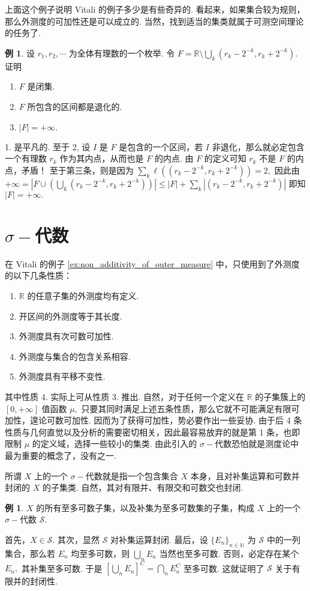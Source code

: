 \documentclass[12pt, a4paper, oneside]{book}
\numberwithin{figure}{section}
\theoremstyle{definition}
\newtheorem{example}[theorem]{例}
\begin{document}
上面这个例子说明 Vitali 的例子多少是有些奇异的. 看起来，如果集合较为规则，那么外测度的可加性还是可以成立的. 当然，找到适当的集类就属于可测空间理论的任务了.

\begin{example}
    设 $r_1,r_2,\cdots$ 为全体有理数的一个枚举. 令 $F=\mathbb R\setminus \bigcup_{k} (r_k-2^{-k},r_k+2^{-k}).$ 证明
    \begin{enumerate}
        \item $F$ 是闭集.
        \item $F$ 所包含的区间都是退化的.
        \item $|F|=+\infty.$
    \end{enumerate}
\end{example}
1. 是平凡的. 至于 2, 设 $I$ 是 $F$ 是包含的一个区间，若 $I$ 非退化，那么就必定包含一个有理数 $r_k$ 作为其内点，从而也是 $F$ 的内点. 由 $F$ 的定义可知 $r_k$ 不是 $F$ 的内点，矛盾！ 
至于第三条，则是因为 $\sum_k \ell((r_k-2^{-k},r_k+2^{-k}))=2,$ 因此由 $+\infty=|F\cup (\bigcup_k (r_k-2^{-k},r_k+2^{-k}))|\leq |F|+\sum_k |(r_k-2^{-k},r_k+2^{-k})|$ 即知 $|F|=+\infty.$


\section{$\sigma-$代数}
在 Vitali 的例子 \eqref{ex:non_additivity_of_outer_measure} 中，只使用到了外测度的以下几条性质：
\begin{enumerate}
    \item $\mathbb R$ 的任意子集的外测度均有定义.
    \item 开区间的外测度等于其长度.
    \item 外测度具有次可数可加性.
    \item 外测度与集合的包含关系相容.
    \item 外测度具有平移不变性.
\end{enumerate}
其中性质 4. 实际上可从性质 3. 推出. 自然，对于任何一个定义在 $\mathbb R$ 的子集簇上的 $[0,+\infty]$ 值函数 $\mu,$ 只要其同时满足上述五条性质，那么它就不可能满足有限可加性，遑论可数可加性. 
因而为了获得可加性，势必要作出一些妥协. 由于后 4 条性质与几何直觉以及分析的需要密切相关，因此最容易放弃的就是第 1 条，也即限制 $\mu$ 的定义域，选择一些较小的集类. 由此引入的 $\sigma-$代数恐怕就是测度论中最为重要的概念了，没有之一.  

所谓 $X$ 上的一个 $\sigma-$代数就是指一个包含集合 $X$ 本身，且对补集运算和可数并封闭的 $X$ 的子集类. 自然，其对有限并、有限交和可数交也封闭.
\begin{example}\label{ex:sigma_algebra_at_most_countable}
    $X$ 的所有至多可数子集，以及补集为至多可数集的子集，构成 $X$ 上的一个 $\sigma-$代数 $\mathcal S.$
\end{example}
首先，$X\in \mathcal S.$ 其次，显然 $\mathcal S$ 对补集运算封闭. 最后，设 $\{E_n\}_{n\in\mathbb N}$ 为 $\mathcal S$ 中的一列集合，那么若 $E_n$ 均至多可数，则 $\bigcup_{n} E_n$ 当然也至多可数. 
否则，必定存在某个 $E_n,$ 其补集至多可数. 于是 $[\bigcup_n E_n]^C=\bigcap_n E_n^C$ 至多可数. 这就证明了 $\mathcal S$ 关于有限并的封闭性.
\end{document}
